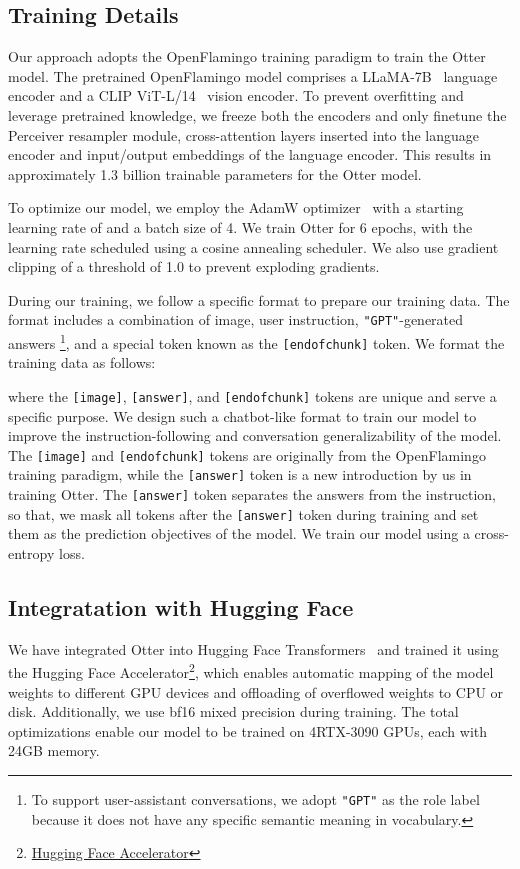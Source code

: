 \documentclass{article}
\begin{document}
\subsection{Training Details}
\label{sec:training}
Our approach adopts the OpenFlamingo training paradigm to train the Otter model. The pretrained OpenFlamingo model comprises a LLaMA-7B~\cite{llama} language encoder and a CLIP ViT-L/14~\cite{clip} vision encoder. To prevent overfitting and leverage pretrained knowledge, we freeze both the encoders and only finetune the Perceiver resampler module, cross-attention layers inserted into the language encoder and input/output embeddings of the language encoder. This results in approximately 1.3 billion trainable parameters for the Otter model.

To optimize our model, we employ the AdamW optimizer~\cite{adamw} with a starting learning rate of  and a batch size of 4. We train Otter for 6 epochs, with the learning rate scheduled using a cosine annealing scheduler. We also use gradient clipping of a threshold of 1.0 to prevent exploding gradients. 

During our training, we follow a specific format to prepare our training data. The format includes a combination of image, user instruction, \texttt{"GPT"}-generated answers \footnote{To support user-assistant conversations, we adopt \texttt{"GPT"} as the role label because it does not have any specific semantic meaning in vocabulary.}, and a special token known as the \texttt{[endofchunk]} token. We format the training data as follows:

where the \texttt{[image]}, \texttt{[answer]}, and \texttt{[endofchunk]} tokens are unique and serve a specific purpose. We design such a chatbot-like format to train our model to improve the instruction-following and conversation generalizability of the model. The \texttt{[image]} and \texttt{[endofchunk]} tokens are originally from the OpenFlamingo training paradigm, while the \texttt{[answer]} token is a new introduction by us in training Otter. The \texttt{[answer]} token separates the answers from the instruction, so that, we mask all tokens after the \texttt{[answer]} token during training and set them as the prediction objectives of the model. We train our model using a cross-entropy loss. 

\subsection{Integratation with Hugging Face}
\label{sec:integrate_hf}
We have integrated Otter into Hugging Face Transformers~\cite{transformers} and trained it using the Hugging Face Accelerator\footnote{\href{https://HuggingFace.co/docs/accelerate/index}{Hugging Face Accelerator}}, which enables automatic mapping of the model weights to different GPU devices and offloading of overflowed weights to CPU or disk. Additionally, we use bf16 mixed precision during training. The total optimizations enable our model to be trained on 4RTX-3090 GPUs, each with 24GB memory.
\end{document}
